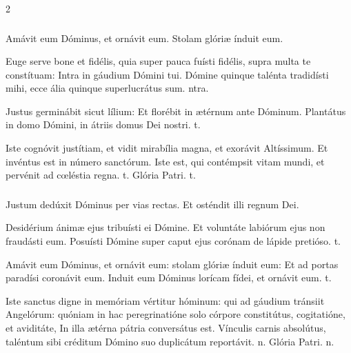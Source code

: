 \documentclass[9pt,twoside]{extarticle}
\begin{document}
\begin{multicols}{2}
\subsubsection*{}
\begin{tightlist}{}
\item {} Amávit eum Dóminus, et ornávit eum.  Stolam glóriæ índuit eum.
\item {} Euge serve bone et fidélis, quia super pauca fuísti fidélis, supra multa te constítuam: \textred{*} Intra in gáudium Dómini tui.  Dómine quinque talénta tradidísti mihi, ecce ália quinque superlucrátus sum. ntra.
\item {} Justus germinábit sicut lílium: \textred{*} Et florébit in ætérnum ante Dóminum.  Plantátus in domo Dómini, in átriis domus Dei nostri. t.
\item {} Iste cognóvit justítiam, et vidit mirabília magna, et exorávit Altíssimum. \textred{*} Et invéntus est in número sanctórum.  Iste est, qui contémpsit vitam mundi, et pervénit ad cœléstia regna. t. Glória Patri. t.
\end{tightlist}

\subsubsection*{}
\begin{tightlist}{}
\item {} Justum dedúxit Dóminus per vias rectas.  Et osténdit illi regnum Dei. 
\item {} Desidérium ánimæ ejus tribuísti ei Dómine. \textred{*} Et voluntáte labiórum ejus non fraudásti eum.  Posuísti Dómine super caput ejus corónam de lápide pretióso. t.
\item {} Amávit eum Dóminus, et ornávit eum: stolam glóriæ índuit eum: \textred{*} Et ad portas paradísi coronávit eum.  Induit eum Dóminus lorícam fídei, et ornávit eum. t.
\item {} Iste sanctus digne in memóriam vértitur hóminum: qui ad gáudium tránsiit Angelórum: quóniam in hac peregrinatióne solo córpore constitútus, cogitatióne, et aviditáte, \textred{*} In illa ætérna pátria conversátus est.  Vínculis carnis absolútus, taléntum sibi créditum Dómino suo duplicátum reportávit. n. Glória Patri. n.
\end{tightlist}


\end{multicols}
\end{document}
